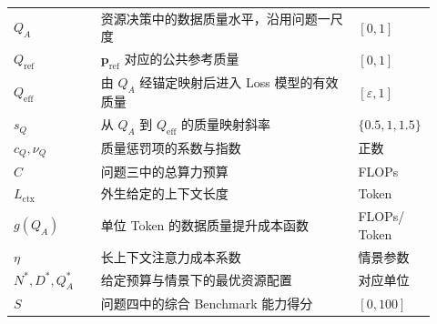 \begin{longtable}{>{\Centering\arraybackslash}p{0.20\linewidth} p{0.59\linewidth} >{\Centering\arraybackslash}p{0.13\linewidth}}
$Q_A$ & 资源决策中的数据质量水平，沿用问题一尺度 & $[0,1]$ \\
$Q_{\mathrm{ref}}$ & $\boldsymbol p_{\mathrm{ref}}$ 对应的公共参考质量 & $[0,1]$ \\
$Q_{\mathrm{eff}}$ & 由 $Q_A$ 经锚定映射后进入 Loss 模型的有效质量 & $[\varepsilon,1]$ \\
$s_Q$ & 从 $Q_A$ 到 $Q_{\mathrm{eff}}$ 的质量映射斜率 & $\{0.5,1,1.5\}$ \\
$c_Q,\nu_Q$ & 质量惩罚项的系数与指数 & 正数 \\
$C$ & 问题三中的总算力预算 & FLOPs \\
$L_{\mathrm{ctx}}$ & 外生给定的上下文长度 & Token \\
$g(Q_A)$ & 单位 Token 的数据质量提升成本函数 & \shortstack{FLOPs/\\Token} \\
$\eta$ & 长上下文注意力成本系数 & 情景参数 \\
$N^*,D^*,Q_A^*$ & 给定预算与情景下的最优资源配置 & 对应单位 \\
$S$ & 问题四中的综合 Benchmark 能力得分 & $[0,100]$ \\
\end{longtable}
